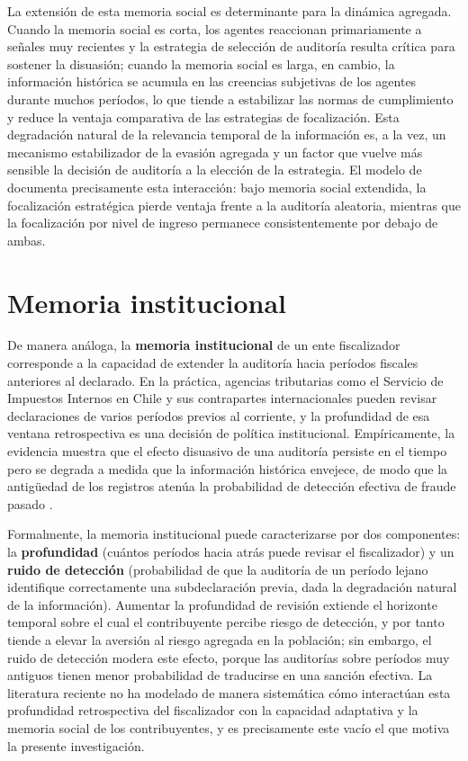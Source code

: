 La extensión de esta memoria social es determinante para la dinámica agregada. Cuando la memoria social es corta, los agentes reaccionan primariamente a señales muy recientes y la estrategia de selección de auditoría resulta crítica para sostener la disuasión; cuando la memoria social es larga, en cambio, la información histórica se acumula en las creencias subjetivas de los agentes durante muchos períodos, lo que tiende a estabilizar las normas de cumplimiento y reduce la ventaja comparativa de las estrategias de focalización. Esta degradación natural de la relevancia temporal de la información es, a la vez, un mecanismo estabilizador de la evasión agregada y un factor que vuelve más sensible la decisión de auditoría a la elección de la estrategia. El modelo de \textcite{canessa2025tax} documenta precisamente esta interacción: bajo memoria social extendida, la focalización estratégica pierde ventaja frente a la auditoría aleatoria, mientras que la focalización por nivel de ingreso permanece consistentemente por debajo de ambas.

\section{Memoria institucional}
\label{sec:memoria-institucional}

De manera análoga, la \textbf{memoria institucional} de un ente fiscalizador corresponde a la capacidad de extender la auditoría hacia períodos fiscales anteriores al declarado. En la práctica, agencias tributarias como el Servicio de Impuestos Internos en Chile y sus contrapartes internacionales pueden revisar declaraciones de varios períodos previos al corriente, y la profundidad de esa ventana retrospectiva es una decisión de política institucional. Empíricamente, la evidencia muestra que el efecto disuasivo de una auditoría persiste en el tiempo pero se degrada a medida que la información histórica envejece, de modo que la antigüedad de los registros atenúa la probabilidad de detección efectiva de fraude pasado \parencite{debacker2018once}.

Formalmente, la memoria institucional puede caracterizarse por dos componentes: la \textbf{profundidad} (cuántos períodos hacia atrás puede revisar el fiscalizador) y un \textbf{ruido de detección} (probabilidad de que la auditoría de un período lejano identifique correctamente una subdeclaración previa, dada la degradación natural de la información). Aumentar la profundidad de revisión extiende el horizonte temporal sobre el cual el contribuyente percibe riesgo de detección, y por tanto tiende a elevar la aversión al riesgo agregada en la población; sin embargo, el ruido de detección modera este efecto, porque las auditorías sobre períodos muy antiguos tienen menor probabilidad de traducirse en una sanción efectiva. La literatura reciente no ha modelado de manera sistemática cómo interactúan esta profundidad retrospectiva del fiscalizador con la capacidad adaptativa y la memoria social de los contribuyentes, y es precisamente este vacío el que motiva la presente investigación.

